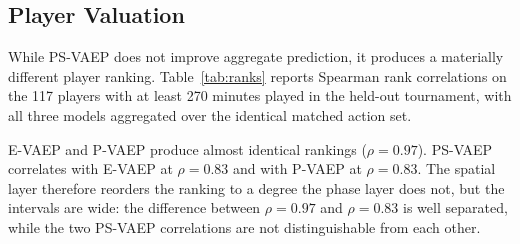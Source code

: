 \documentclass[runningheads]{llncs}
\begin{document}
\subsection{Player Valuation}
\label{sec:players}
While PS-VAEP does not improve aggregate prediction, it produces a materially different player ranking. Table~\ref{tab:ranks} reports Spearman rank correlations on the 117 players with at least 270 minutes played in the held-out tournament, with all three models aggregated over the identical matched action set.

E-VAEP and P-VAEP produce almost identical rankings ($\rho = 0.97$). PS-VAEP correlates with E-VAEP at $\rho = 0.83$ and with P-VAEP at $\rho = 0.83$. The spatial layer therefore reorders the ranking to a degree the phase layer does not, but the intervals are wide: the difference between $\rho = 0.97$ and $\rho = 0.83$ is well separated, while the two PS-VAEP correlations are not distinguishable from each other.
\end{document}
